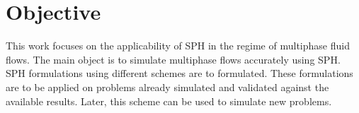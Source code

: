 \section{Objective}

This work focuses on the applicability of SPH in the regime of multiphase fluid flows. The main object is to simulate multiphase
flows accurately using SPH. \\

SPH formulations using different schemes are to formulated. These formulations are to be applied on problems already simulated
and validated against the available results. Later, this scheme can be used to simulate new problems. 


